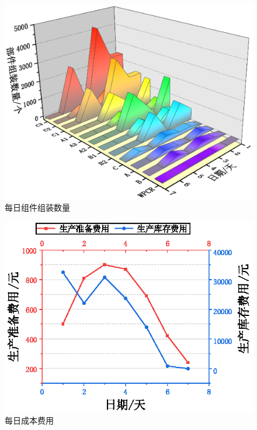 \begin{figure}[!htbp]
	\centering
	\includegraphics{Image/问题二展示.eps}
	\caption{每日组件组装数量}\label{每日组件组装数量}
\end{figure}

\begin{figure}[!htbp]
	\centering
	\includegraphics{Image/问题二展示2.eps}
	\caption{每日成本费用}\label{每日成本费用}
\end{figure}


